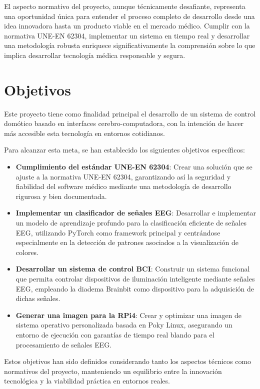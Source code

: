 El aspecto normativo del proyecto, aunque técnicamente desafiante, representa una oportunidad única para entender el proceso completo de desarrollo desde una idea innovadora hasta un producto viable en el mercado médico. Cumplir con la normativa UNE-EN 62304, implementar un sistema en tiempo real y desarrollar una metodología robusta enriquece significativamente la comprensión sobre lo que implica desarrollar tecnología médica responsable y segura.

\section{Objetivos}
Este proyecto tiene como finalidad principal el desarrollo de un sistema de control domótico basado en interfaces cerebro-computadora, con la intención de hacer más accesible esta tecnología en entornos cotidianos.

Para alcanzar esta meta, se han establecido los siguientes objetivos específicos:

\begin{itemize}
    \item \textbf{Cumplimiento del estándar UNE-EN 62304}: Crear una solución que se ajuste a la normativa UNE-EN 62304, garantizando así la seguridad y fiabilidad del software médico mediante una metodología de desarrollo rigurosa y bien documentada.
    
    \item \textbf{Implementar un clasificador de señales EEG}: Desarrollar e implementar un modelo de aprendizaje profundo para la clasificación eficiente de señales EEG, utilizando PyTorch como framework principal y centrándose especialmente en la detección de patrones asociados a la visualización de colores.
    
    \item \textbf{Desarrollar un sistema de control BCI}: Construir un sistema funcional que permita controlar dispositivos de iluminación inteligente mediante señales EEG, empleando la diadema Brainbit como dispositivo para la adquisición de dichas señales.
    
    \item \textbf{Generar una imagen para la RPi4}: Crear y optimizar una imagen de sistema operativo personalizada basada en Poky Linux, asegurando un entorno de ejecución con garantías de tiempo real blando para el procesamiento de señales EEG.
\end{itemize}

Estos objetivos han sido definidos considerando tanto los aspectos técnicos como normativos del proyecto, manteniendo un equilibrio entre la innovación tecnológica y la viabilidad práctica en entornos reales.

